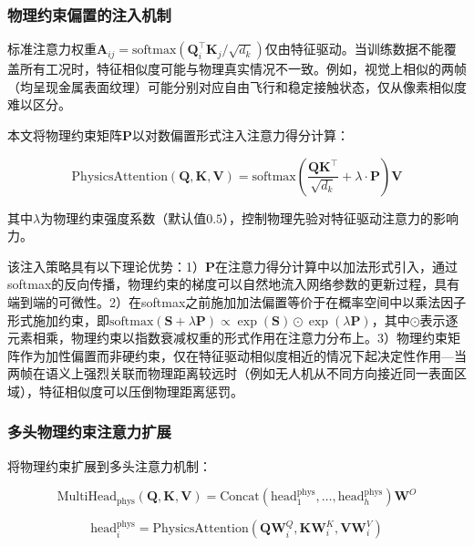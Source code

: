 \subsubsection{物理约束偏置的注入机制}

标准注意力权重$\mathbf{A}_{ij} = \text{softmax}(\mathbf{Q}_i^\top \mathbf{K}_j / \sqrt{d_k})$仅由特征驱动。当训练数据不能覆盖所有工况时，特征相似度可能与物理真实情况不一致。例如，视觉上相似的两帧（均呈现金属表面纹理）可能分别对应自由飞行和稳定接触状态，仅从像素相似度难以区分。

本文将物理约束矩阵$\mathbf{P}$以对数偏置形式注入注意力得分计算：

\begin{equation}
\text{PhysicsAttention}(\mathbf{Q}, \mathbf{K}, \mathbf{V}) = \text{softmax}\left(\frac{\mathbf{Q} \mathbf{K}^\top}{\sqrt{d_k}} + \lambda \cdot \mathbf{P}\right) \mathbf{V}
\label{eq:physics_attention}
\end{equation}

其中$\lambda$为物理约束强度系数（默认值$0.5$），控制物理先验对特征驱动注意力的影响力。

该注入策略具有以下理论优势：1）$\mathbf{P}$在注意力得分计算中以加法形式引入，通过softmax的反向传播，物理约束的梯度可以自然地流入网络参数的更新过程，具有端到端的可微性。2）在softmax之前施加加法偏置等价于在概率空间中以乘法因子形式施加约束，即$\text{softmax}(\mathbf{S} + \lambda \mathbf{P}) \propto \exp(\mathbf{S}) \odot \exp(\lambda \mathbf{P})$，其中$\odot$表示逐元素相乘，物理约束以指数衰减权重的形式作用在注意力分布上。3）物理约束矩阵作为加性偏置而非硬约束，仅在特征驱动相似度相近的情况下起决定性作用---当两帧在语义上强烈关联而物理距离较远时（例如无人机从不同方向接近同一表面区域），特征相似度可以压倒物理距离惩罚。

\subsubsection{多头物理约束注意力扩展}

将物理约束扩展到多头注意力机制：

\begin{equation}
\text{MultiHead}_{\text{phys}}(\mathbf{Q}, \mathbf{K}, \mathbf{V}) = \text{Concat}(\text{head}_1^{\text{phys}}, \ldots, \text{head}_h^{\text{phys}}) \mathbf{W}^O
\label{eq:multihead_phys}
\end{equation}

\begin{equation}
\text{head}_i^{\text{phys}} = \text{PhysicsAttention}(\mathbf{Q}\mathbf{W}_i^Q, \mathbf{K}\mathbf{W}_i^K, \mathbf{V}\mathbf{W}_i^V)
\label{eq:head_i_phys}
\end{equation}

